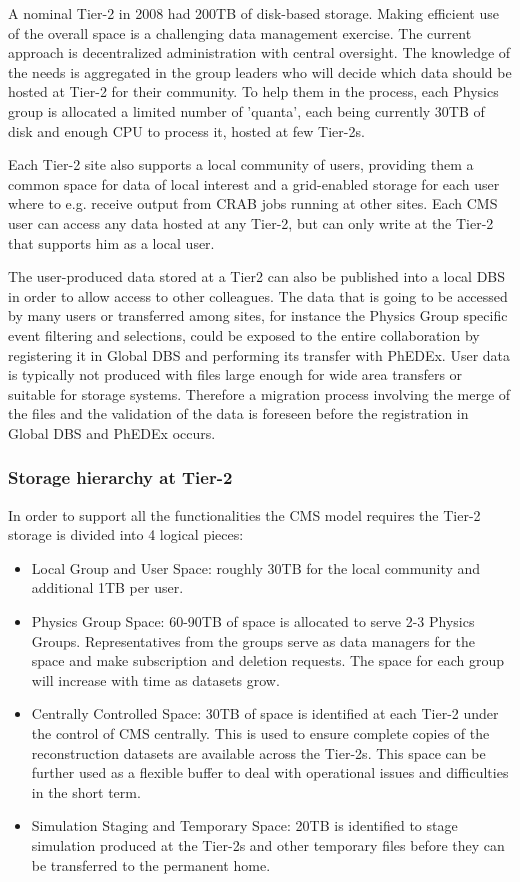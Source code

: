 A nominal Tier-2 in 2008 had 200TB of disk-based storage.
Making efficient use of the overall space is a challenging data management exercise.
The current approach is decentralized administration with central oversight.
The knowledge of the needs is aggregated in the group leaders who will decide which data should be hosted at Tier-2 for their community. To help
them in the process, each Physics group is allocated a limited number 
of 'quanta', each being currently 30TB of disk and enough CPU to process it, hosted at few Tier-2s. 

Each Tier-2 site also supports a local community of users, providing them
a common space for data of local interest and a grid-enabled
storage for each user where to e.g. receive output from CRAB jobs
running at other sites. Each CMS user can access any data
hosted at any Tier-2, but can only write at the Tier-2 that supports him
as a local user.

The user-produced data stored at a Tier2 can also be published into a local DBS
in order to allow access to other colleagues.
The data that is going to be accessed by many users or transferred among sites, for instance the Physics Group specific event filtering and selections,
could be exposed to the entire collaboration by registering it in Global DBS and performing its transfer with PhEDEx.
User data is typically not produced with files large enough for wide area transfers or suitable for storage systems. Therefore a migration process involving the merge of the files and the validation of the data is foreseen before the registration in Global DBS and PhEDEx occurs.
 
\subsubsection{Storage hierarchy at Tier-2}
In order to support all the functionalities the CMS model requires the Tier-2 storage is divided into 4 logical pieces:
\begin{itemize}
\item{} Local Group and User Space: roughly 30TB for the local community and additional 1TB per user.
\item{} Physics Group Space: 60-90TB of space is allocated to serve 2-3 Physics Groups. Representatives from the groups serve as data managers for the space and make subscription and deletion requests.
The space for each group will increase with time as datasets grow.
\item{} Centrally Controlled Space: 30TB of space is identified at each Tier-2 under the control of CMS centrally.
This is used to ensure complete copies of the reconstruction datasets are available across the Tier-2s. This space can be further used as a flexible buffer to deal with operational issues and difficulties in the short term.
\item{} Simulation Staging and Temporary Space: 20TB is identified to
stage simulation produced at the Tier-2s and other temporary
files before they can be transferred to the permanent home. 
\end{itemize}

